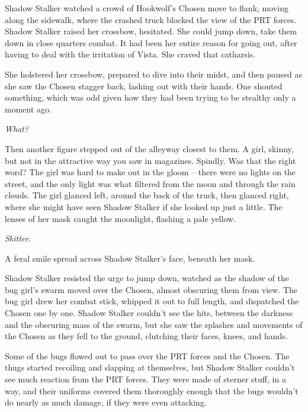 Shadow Stalker watched a crowd of Hookwolf's Chosen move to flank, moving along the sidewalk, where the crashed truck blocked the view of the PRT forces.  Shadow Stalker raised her crossbow, hesitated.  She could jump down, take them down in close quarters combat.  It had been her entire reason for going out, after having to deal with the irritation of Vista.  She craved that catharsis.



She holstered her crossbow, prepared to dive into their midst, and then paused as she saw the Chosen stagger back, lashing out with their hands.  One shouted something, which was odd given how they had been trying to be stealthy only a moment ago.



\emph{What?}



Then another figure stepped out of the alleyway closest to them.  A girl, skinny, but not in the attractive way you saw in magazines.  Spindly.  Was that the right word?  The girl was hard to make out in the gloom – there were no lights on the street, and the only light was what filtered from the moon and through the rain clouds.  The girl glanced left, around the back of the truck, then glanced right, where she might have seen Shadow Stalker if she looked up just a little.  The lenses of her mask caught the moonlight, flashing a pale yellow.



\emph{Skitter}.



A feral smile spread across Shadow Stalker's face, beneath her mask.



Shadow Stalker resisted the urge to jump down, watched as the shadow of the bug girl's swarm moved over the Chosen, almost obscuring them from view.  The bug girl drew her combat stick, whipped it out to full length, and dispatched the Chosen one by one.  Shadow Stalker couldn't see the hits, between the darkness and the obscuring mass of the swarm, but she saw the splashes and movements of the Chosen as they fell to the ground, clutching their faces, knees, and hands.



Some of the bugs flowed out to pass over the PRT forces and the Chosen.  The thugs started recoiling and slapping at themselves, but Shadow Stalker couldn't see much reaction from the PRT forces.  They were made of sterner stuff, in a way, and their uniforms covered them thoroughly enough that the bugs wouldn't do nearly as much damage, if they were even attacking.



